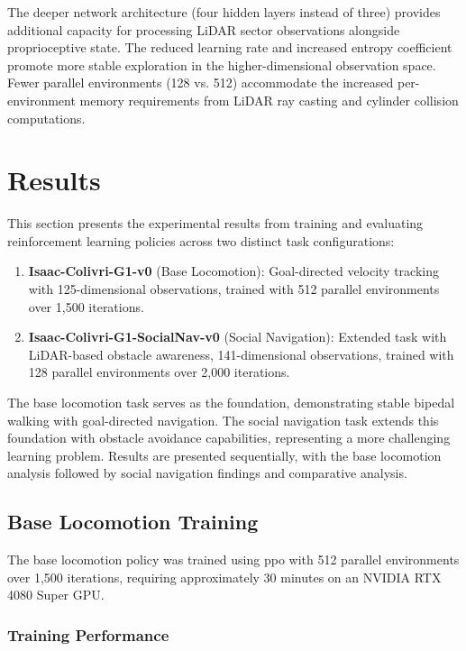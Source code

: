 \documentclass[12pt,a4paper]{article}
\begin{document}
The deeper network architecture (four hidden layers instead of three) provides additional capacity for processing LiDAR sector observations alongside proprioceptive state. The reduced learning rate and increased entropy coefficient promote more stable exploration in the higher-dimensional observation space. Fewer parallel environments (128 vs. 512) accommodate the increased per-environment memory requirements from LiDAR ray casting and cylinder collision computations.

\newpage

\section{Results}

This section presents the experimental results from training and evaluating reinforcement learning policies across two distinct task configurations:

\begin{enumerate}
    \item \textbf{Isaac-Colivri-G1-v0} (Base Locomotion): Goal-directed velocity tracking with 125-dimensional observations, trained with 512 parallel environments over 1,500 iterations.
    \item \textbf{Isaac-Colivri-G1-SocialNav-v0} (Social Navigation): Extended task with LiDAR-based obstacle awareness, 141-dimensional observations, trained with 128 parallel environments over 2,000 iterations.
\end{enumerate}

The base locomotion task serves as the foundation, demonstrating stable bipedal walking with goal-directed navigation. The social navigation task extends this foundation with obstacle avoidance capabilities, representing a more challenging learning problem. Results are presented sequentially, with the base locomotion analysis followed by social navigation findings and comparative analysis.

\subsection{Base Locomotion Training}

The base locomotion policy was trained using \ac{ppo} with 512 parallel environments over 1,500 iterations, requiring approximately 30 minutes on an NVIDIA RTX 4080 Super GPU.

\subsubsection{Training Performance}
\end{document}
